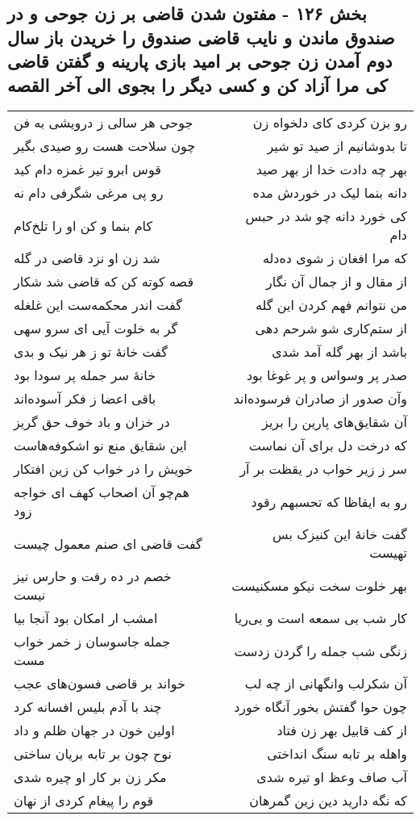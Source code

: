 \begin{center}
\section*{بخش ۱۲۶ - مفتون شدن قاضی بر زن جوحی و در صندوق ماندن و نایب قاضی صندوق را خریدن باز سال دوم آمدن زن جوحی بر امید بازی پارینه و گفتن قاضی کی مرا آزاد کن و کسی دیگر را بجوی الی آخر القصه}
\label{sec:sh126}
\begin{longtable}{l p{0.5cm} r}
جوحی هر سالی ز درویشی به فن
&&
رو بزن کردی کای دلخواه زن
\\
چون سلاحت هست رو صیدی بگیر
&&
تا بدوشانیم از صید تو شیر
\\
قوس ابرو تیر غمزه دام کید
&&
بهر چه دادت خدا از بهر صید
\\
رو پی مرغی شگرفی دام نه
&&
دانه بنما لیک در خوردش مده
\\
کام بنما و کن او را تلخ‌کام
&&
کی خورد دانه چو شد در حبس دام
\\
شد زن او نزد قاضی در گله
&&
که مرا افغان ز شوی ده‌دله
\\
قصه کوته کن که قاضی شد شکار
&&
از مقال و از جمال آن نگار
\\
گفت اندر محکمه‌ست این غلغله
&&
من نتوانم فهم کردن این گله
\\
گر به خلوت آیی ای سرو سهی
&&
از ستم‌کاری شو شرحم دهی
\\
گفت خانهٔ تو ز هر نیک و بدی
&&
باشد از بهر گله آمد شدی
\\
خانهٔ سر جمله پر سودا بود
&&
صدر پر وسواس و پر غوغا بود
\\
باقی اعضا ز فکر آسوده‌اند
&&
وآن صدور از صادران فرسوده‌اند
\\
در خزان و باد خوف حق گریز
&&
آن شقایق‌های پارین را بریز
\\
این شقایق منع نو اشکوفه‌هاست
&&
که درخت دل برای آن نماست
\\
خویش را در خواب کن زین افتکار
&&
سر ز زیر خواب در یقظت بر آر
\\
هم‌چو آن اصحاب کهف ای خواجه زود
&&
رو به ایقاظا که تحسبهم رقود
\\
گفت قاضی ای صنم معمول چیست
&&
گفت خانهٔ این کنیزک بس تهیست
\\
خصم در ده رفت و حارس نیز نیست
&&
بهر خلوت سخت نیکو مسکنیست
\\
امشب ار امکان بود آنجا بیا
&&
کار شب بی سمعه است و بی‌ریا
\\
جمله جاسوسان ز خمر خواب مست
&&
زنگی شب جمله را گردن زدست
\\
خواند بر قاضی فسون‌های عجب
&&
آن شکرلب وانگهانی از چه لب
\\
چند با آدم بلیس افسانه کرد
&&
چون حوا گفتش بخور آنگاه خورد
\\
اولین خون در جهان ظلم و داد
&&
از کف قابیل بهر زن فتاد
\\
نوح چون بر تابه بریان ساختی
&&
واهله بر تابه سنگ انداختی
\\
مکر زن بر کار او چیره شدی
&&
آب صاف وعظ او تیره شدی
\\
قوم را پیغام کردی از نهان
&&
که نگه دارید دین زین گمرهان
\\
\end{longtable}
\end{center}
